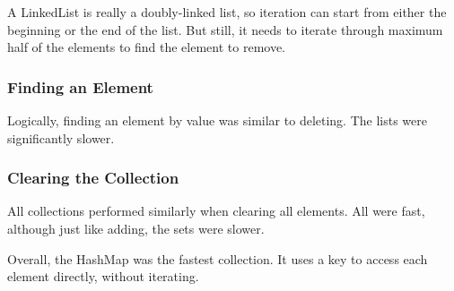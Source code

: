 A LinkedList is really a doubly-linked list, so iteration can start from either the beginning or the end of the list. But still, it needs to iterate through maximum half of the elements to find the element to remove.

\subsubsection{Finding an Element}
Logically, finding an element by value was similar to deleting. The lists were significantly slower.

\subsubsection{Clearing the Collection}
All collections performed similarly when clearing all elements. All were fast, although just like adding, the sets were slower.
 
Overall, the HashMap was the fastest collection. It uses a key to access each element directly, without iterating.